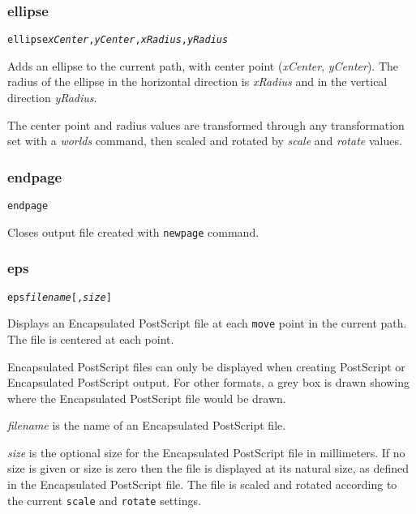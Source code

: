 \subsubsection{ellipse}

\begin{alltt}
ellipse \textit{xCenter}, \textit{yCenter}, \textit{xRadius}, \textit{yRadius}
\end{alltt}

Adds an ellipse to the current path, with center
point (\textit{xCenter}, \textit{yCenter}).  The radius of the ellipse
in the horizontal direction is \textit{xRadius} and in the vertical
direction \textit{yRadius}.

The center point and radius values are transformed through any
transformation set with a \textit{worlds} command,
then scaled and rotated by \textit{scale}
and \textit{rotate} values.

\subsubsection{endpage}

\begin{alltt}
endpage
\end{alltt}

Closes output file created with \texttt{newpage} command.

\subsubsection{eps}

\begin{alltt}
eps \textit{filename} [, \textit{size}]
\end{alltt}

Displays an Encapsulated PostScript file at each \texttt{move} point in
the current path.  The file is centered at each point.

Encapsulated PostScript files can only be displayed when creating
PostScript or Encapsulated PostScript output.  For other formats,
a grey box is drawn showing where the Encapsulated PostScript file
would be drawn.

\textit{filename} is the name of an Encapsulated PostScript file.

\textit{size} is the optional size for the Encapsulated PostScript file
in millimeters.  If no size
is given or size is zero then the file is displayed at its natural size,
as defined in the Encapsulated PostScript file.
The file is scaled and rotated according to the current \texttt{scale}
and \texttt{rotate} settings.

